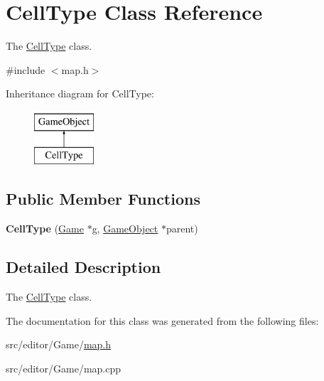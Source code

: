 \hypertarget{class_cell_type}{\section{\-Cell\-Type \-Class \-Reference}
\label{class_cell_type}
}


\-The \hyperlink{class_cell_type}{\-Cell\-Type} class.  




{\ttfamily \#include $<$map.\-h$>$}

\-Inheritance diagram for \-Cell\-Type\-:\begin{figure}[H]
\begin{center}
\leavevmode
\includegraphics[height=2.000000cm]{class_cell_type}
\end{center}
\end{figure}
\subsection*{\-Public \-Member \-Functions}
\begin{DoxyCompactItemize}
\item 
\hypertarget{class_cell_type_a9764b05a46f0227100874d909ea0e0ce}{{\bfseries \-Cell\-Type} (\hyperlink{class_game}{\-Game} $\ast$g, \hyperlink{class_game_object}{\-Game\-Object} $\ast$parent)}\label{class_cell_type_a9764b05a46f0227100874d909ea0e0ce}

\end{DoxyCompactItemize}


\subsection{\-Detailed \-Description}
\-The \hyperlink{class_cell_type}{\-Cell\-Type} class. 

\-The documentation for this class was generated from the following files\-:\begin{DoxyCompactItemize}
\item 
src/editor/\-Game/\hyperlink{map_8h}{map.\-h}\item 
src/editor/\-Game/map.\-cpp\end{DoxyCompactItemize}
